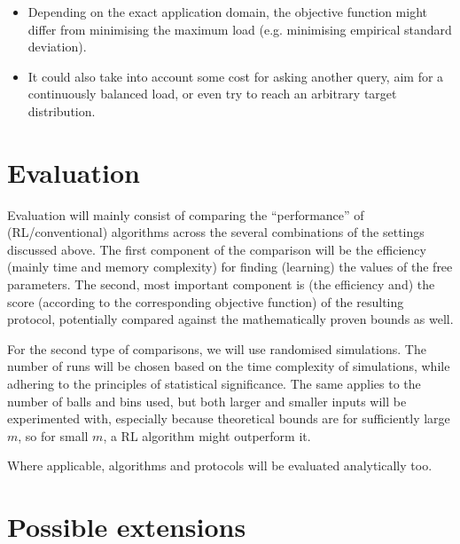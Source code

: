 \documentclass[11pt,a4paper]{article}
\begin{document}
\begin{itemize}
    \begin{itemize}
        \item
        Depending on the exact application domain, the objective function might differ from minimising the maximum load (e.g. minimising empirical standard deviation).
        \item
        It could also take into account some cost for asking another query, aim for a continuously balanced load, or even try to reach an arbitrary target distribution.
    \end{itemize}
\end{itemize}


\section{Evaluation}

Evaluation will mainly consist of comparing the ``performance'' of (RL/conventional) algorithms across the several combinations of the settings discussed above. The first component of the comparison will be the efficiency (mainly time and memory complexity) for finding (learning) the values of the free parameters. The second, most important component is (the efficiency and) the score (according to the corresponding objective function) of the resulting protocol, potentially compared against the mathematically proven bounds as well.

For the second type of comparisons, we will use randomised simulations. The number of runs will be chosen based on the time complexity of simulations, while adhering to the principles of statistical significance. The same applies to the number of balls and bins used, but both larger and smaller inputs will be experimented with, especially because theoretical bounds are for sufficiently large $m$, so for small $m$, a RL algorithm might outperform it.

Where applicable, algorithms and protocols will be evaluated analytically too.

\section{Possible extensions}
\end{document}
